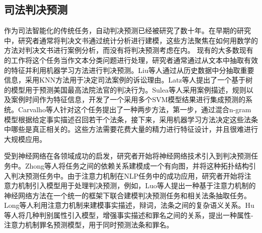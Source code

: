 \subsection{司法判决预测}
作为司法智能化的传统任务，自动判决预测已经被研究了数十年。在早期的研究中，研究者通常将判决文书通过统计分析进行建模\cite{LiuC03, kort1957predicting, nagel1963applying, ulmer1963quantitative, keown1980mathematical}，这些方法聚焦在如何用数学的方法对判决文书进行案例分析，而没有将判决预测考虑在内。
现有的大多数现有的工作将这个任务当作文本分类问题进行处理，研究者通常通过从文本中抽取有效的特征并利用机器学习方法进行判决预测\cite{kim2014legal, AletrasTPL16, liu2015predicting}。Liu等人通过从历史数据中分抽取重要信息，采用KNN方法用于决定司法案例的诉讼理由\cite{LiuCH04}。Latz等人提出了一个基于树的模型用于预测美国最高法院法官的判决行为\cite{KatzBB14}。Sulea等人采用案例描述，规则以及案例时间作为特征信息，开发了一个采用多个SVM模型结果进行集成预测的系统\cite{Sulea2017Exploring}。Carvalho等人针对这个任务提出了一种两步方法，第一步，通过混合n-gram模型根据给定事实描述召回若干个法条，接下来，采用机器学习方法决定这些法条中哪些是真正相关的\cite{carvalho2015lexical}。这些方法需要花费大量的精力进行特征设计，并且很难进行大规模应用。

受到神经网络在各领域成功的启发\cite{Kim14, BordesGWB12, LuongSLVZ15}，研究者开始将神经网络技术引入到判决预测任务中。Zhong等人将任务之间的依赖关系建模成一个有向图，并将这种拓扑结构引入判决预测任务中\cite{ZhongGTX0S18}。由于注意力机制在NLP任务中的成功应用，研究者开始将注意力机制引入模型用于处理判决预测，例如，Luo等人提出一种基于注意力机制的神经网络方法在一个统一的框架下联合建模判决预测任务和相关法条抽取任务\cite{luo2017learning}。Long等人利用注意力机制来建模事实描述，辩词，法条之间的复杂语义关系\cite{abs-1809-06537}。Hu等人将几种判别属性引入模型，增强事实描述和罪名之间的关系，提出一种属性-注意力机制罪名预测模型，用于同时预测法条和罪名\cite{C18-1041}。

